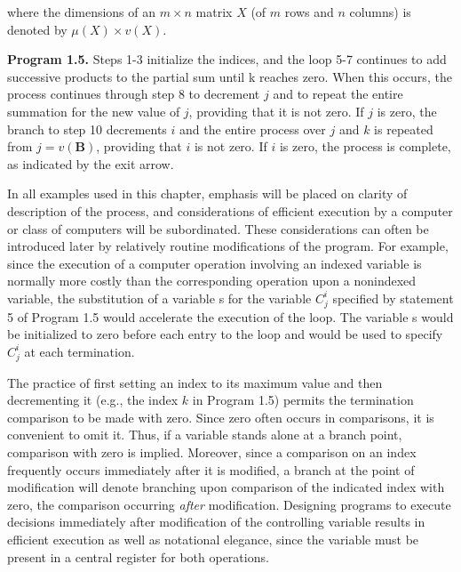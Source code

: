 \noindent where the dimensions of an $m \times n$ matrix $X$ (of $m$ rows and $n$ columns) is denoted by $\mu(X) \times v(X)$.

\par \textbf{Program 1.5.} Steps 1-3 initialize the indices, and the loop 5-7 continues to add successive products to the partial sum until k reaches zero. When this occurs, the process continues through step 8 to decrement $j$ and to repeat the entire summation for the new value of $j$, providing that it is not zero. If $j$ is zero, the branch to step 10 decrements $i$ and the entire process over $j$ and $k$ is repeated from $j = v(\textbf{B})$, providing that $i$ is not zero. If $i$ is zero, the process is complete, as indicated by the exit arrow.

\par In all examples used in this chapter, emphasis will be placed on clarity of description of the process, and considerations of efficient execution by a computer or class of computers will be subordinated. These considerations can often be introduced later by relatively routine modifications of the program. For example, since the execution of a computer operation involving an indexed variable is normally more costly than the corresponding operation upon a nonindexed variable, the substitution of a variable s for the variable $C^i_j $ specified by statement 5 of Program 1.5 would accelerate the execution of the loop. The variable s would be initialized to zero before each entry to the loop and would be used to specify $C^i_j$ at each termination.

\par The practice of first setting an index to its maximum value and then decrementing it (e.g., the index $k$ in Program 1.5) permits the termination comparison to be made with zero. Since zero often occurs in comparisons, it is convenient to omit it. Thus, if a variable stands alone at a branch point, comparison with zero is implied. Moreover, since a comparison on an index frequently occurs immediately after it is modified, a branch at the point of modification will denote branching upon comparison of the indicated index with zero, the comparison occurring \textit{after} modification. Designing programs to execute decisions immediately after modification of the controlling variable results in efficient execution as well as notational elegance, since the variable must be present in a central register for both operations.


